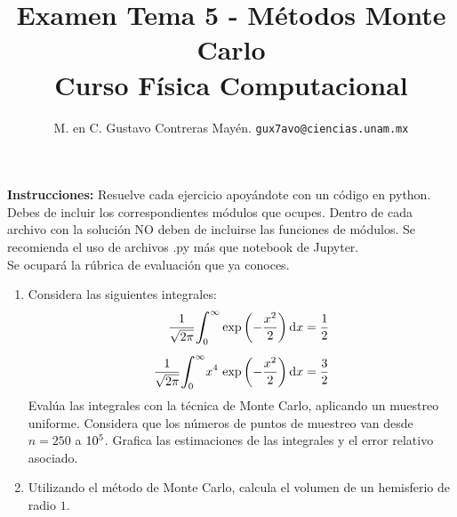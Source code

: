 
\usepackage{minted}

\author{M. en C. Gustavo Contreras Mayén. \texttt{gux7avo@ciencias.unam.mx}}
\title{Examen Tema 5 - Métodos Monte Carlo \\ {\large Curso Física Computacional}}
\date{ }


\maketitle
\fontsize{14}{14}\selectfont

\textbf{Instrucciones: } Resuelve cada ejercicio apoyándote con un código en python. Debes de incluir los correspondientes módulos que ocupes. Dentro de cada archivo con la solución NO deben de incluirse las funciones de módulos. Se recomienda el uso de archivos .py más que notebook de Jupyter.
\\
\noindent
Se ocupará la rúbrica de evaluación que ya conoces.

\begin{enumerate}
\item Considera las siguientes integrales:
\begin{align*}
\dfrac{1}{\sqrt{2 \pi}} \scaleint{6ex}_{\bs 0}^{\infty} \exp\left( -\dfrac{x^{2}}{2}\right) \dd{x} &= \dfrac{1}{2} \\[0.5em]
\dfrac{1}{\sqrt{2 \pi}} \scaleint{6ex}_{\bs 0}^{\infty} x^{4} \, \exp\left( -\dfrac{x^{2}}{2}\right) \dd{x} &= \dfrac{3}{2}
\end{align*}
Evalúa las integrales con la técnica de Monte Carlo, aplicando un muestreo uniforme. Considera que  los números de puntos de muestreo van desde $n = 250$ a $\num{d5}$. Grafica las estimaciones de las integrales y el error relativo asociado.
\item Utilizando el método de Monte Carlo, calcula el volumen de un hemisferio de radio $1$.
\end{enumerate}
